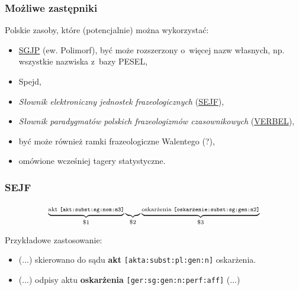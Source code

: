 \documentclass[xcolor=dvipsnames,polish]{beamer}
\begin{document}
\begin{frame}
  \frametitle{Możliwe zastępniki}

Polskie zasoby, które (potencjalnie) można wykorzystać:
\begin{itemize}
\item \href{http://sgjp.pl/}{SGJP} (ew. Polimorf), być może rozszerzony o~więcej nazw
  własnych, np. wszystkie nazwiska z~bazy PESEL,
\item Spejd,
\item \emph{Słownik elektroniczny jednostek frazeologicznych} (\href{http://zil.ipipan.waw.pl/SEJF}{SEJF}),
\item \emph{Słownik paradygmatów polskich frazeologizmów czasownikowych} (\href{http://uwm.edu.pl/verbel/}{VERBEL}),
\item być może również ramki frazeologiczne Walentego (?),
\item omówione wcześniej tagery statystyczne.
\end{itemize}


\end{frame}

\begin{frame}%
  \frametitle{SEJF}


\[\scriptsize
\underbrace{\text{akt
    \texttt{[akt:subst:sg:nom:m3]}}}_{\text{\$1}}\underbrace{\phantom{Fg}}_{\text{\$2}}
\underbrace{\text{oskarżenia \texttt{[oskarżenie:subst:sg:gen:n2]}}}_{\text{\$3}}
\]

Przykładowe zastosowanie:
\begin{itemize}
\item (...) skierowano do sądu \textbf{akt} \texttt{\small[akta:subst:pl:gen:n]} oskarżenia.

\item (...)
odpisy aktu \textbf{oskarżenia} \texttt{\small [ger:sg:gen:n:perf:aff]} (...)
\end{itemize}
\end{frame}
\end{document}
